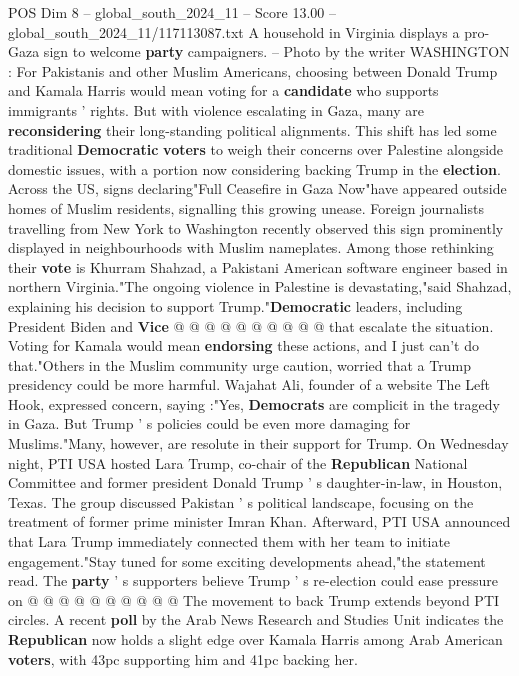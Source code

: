 \begin{textsample}{POS Dim 8 – global\_south\_2024\_11 – Score 13.00 – global\_south\_2024\_11/117113087.txt}  \label{ex:f8_pos_140}
A household in Virginia displays a pro-Gaza sign to welcome \textbf{party} campaigners. -- Photo by the writer WASHINGTON : For Pakistanis and other Muslim Americans, choosing between Donald Trump and Kamala Harris would mean voting for a \textbf{candidate} who supports immigrants ' rights.
But with violence escalating in Gaza, many are \textbf{reconsidering} their long-standing political alignments.
This shift has led some traditional \textbf{Democratic} \textbf{voters} to weigh their concerns over Palestine alongside domestic issues, with a portion now considering backing Trump in the \textbf{election}.
Across the US, signs declaring"Full Ceasefire in Gaza Now"have appeared outside homes of Muslim residents, signalling this growing unease.
Foreign journalists travelling from New York to Washington recently observed this sign prominently displayed in neighbourhoods with Muslim nameplates.
Among those rethinking their \textbf{vote} is Khurram Shahzad, a Pakistani American software engineer based in northern Virginia."The ongoing violence in Palestine is devastating,"said Shahzad, explaining his decision to support Trump."\textbf{Democratic} leaders, including President Biden and \textbf{Vice} @ @ @ @ @ @ @ @ @ @ that escalate the situation.
Voting for Kamala would mean \textbf{endorsing} these actions, and I just can't do that."Others in the Muslim community urge caution, worried that a Trump presidency could be more harmful.
Wajahat Ali, founder of a website The Left Hook, expressed concern, saying :"Yes, \textbf{Democrats} are complicit in the tragedy in Gaza.
But Trump ' s policies could be even more damaging for Muslims."Many, however, are resolute in their support for Trump.
On Wednesday night, PTI USA hosted Lara Trump, co-chair of the \textbf{Republican} National Committee and former president Donald Trump ' s daughter-in-law, in Houston, Texas.
The group discussed Pakistan ' s political landscape, focusing on the treatment of former prime minister Imran Khan.
Afterward, PTI USA announced that Lara Trump immediately connected them with her team to initiate engagement."Stay tuned for some exciting developments ahead,"the statement read.
The \textbf{party} ' s supporters believe Trump ' s re-election could ease pressure on @ @ @ @ @ @ @ @ @ @ The movement to back Trump extends beyond PTI circles.
A recent \textbf{poll} by the Arab News Research and Studies Unit indicates the \textbf{Republican} now holds a slight edge over Kamala Harris among Arab American \textbf{voters}, with 43pc supporting him and 41pc backing her.

\end{textsample}
